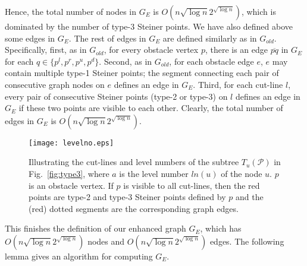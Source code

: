 \documentclass[english,runningheads,11pt]{llncs}
\def\calP{\mathcal{P}}
\begin{document}
Hence, the total number of nodes in $G_E$ is $O(n\sqrt{\log
n}2^{\sqrt{\log n}})$, which is dominated by the number of type-3
Steiner points.
We have also defined above some edges in $G_E$. The rest of
edges in $G_E$ are defined similarly as in $G_{old}$. Specifically,
first, as in $G_{old}$, for every obstacle vertex $p$,
there is an edge $\overline{pq}$ in $G_E$ for each $q\in
\{p^l,p^r,p^u,p^d\}$. Second, as in $G_{old}$,
for each obstacle edge $e$, $e$ may contain
multiple type-1 Steiner points;
the segment connecting each pair of consecutive graph nodes on $e$ defines an
edge in $G_E$. Third, for each cut-line $l$, every pair of
consecutive Steiner points (type-2 or type-3)
on $l$ defines an edge in $G_E$ if
these two points are visible to each other.
Clearly, the total number of edges in $G_E$ is $O(n\sqrt{\log
n}2^{\sqrt{\log n}})$.


\begin{figure}[t]
\begin{minipage}[t]{\linewidth}
\begin{center}
\texttt{[image: levelno.eps]}
\caption{\footnotesize Illustrating the cut-lines and level numbers of the subtree $T_u(\calP)$ in Fig.~\ref{fig:type3}, where $a$ is the level number $ln(u)$ of the node $u$. $p$ is an obstacle vertex. If $p$ is visible to all cut-lines, then the red points are type-2 and type-3 Steiner points defined by $p$ and the (red) dotted segments are the corresponding graph edges. }
\label{fig:levelno}
\end{center}
\end{minipage}
\vspace*{-0.15in}
\end{figure}


This finishes the definition of our enhanced graph $G_E$, which has
$O(n\sqrt{\log n}2^{\sqrt{\log n}})$ nodes and $O(n\sqrt{\log n}2^{\sqrt{\log n}})$
edges. The following lemma gives an algorithm for computing $G_E$.
\end{document}

